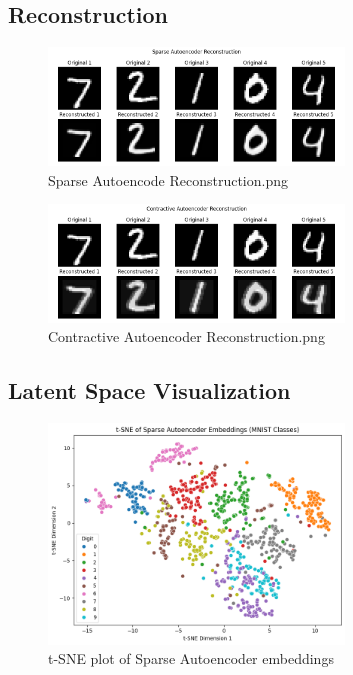 \documentclass[12pt]{article}
\begin{document}
\subsection*{Reconstruction}
\begin{figure}[h!]
\centering
\includegraphics[width=0.7\textwidth]{Sparse_Autoencoder_reconstruction.png}
\caption{Sparse Autoencode Reconstruction.png}
\end{figure}
\begin{figure}[h!]
\centering
\includegraphics[width=0.7\textwidth]{Contractive_Autoencoder_reconstruction.png}
\caption{Contractive Autoencoder Reconstruction.png}
\end{figure}

\subsection*{Latent Space Visualization}

\begin{figure}[h!]
\centering
\includegraphics[width=0.7\textwidth]{sparse_tsne_placeholder.png}
\caption{t-SNE plot of Sparse Autoencoder embeddings }
\end{figure}
\end{document}
